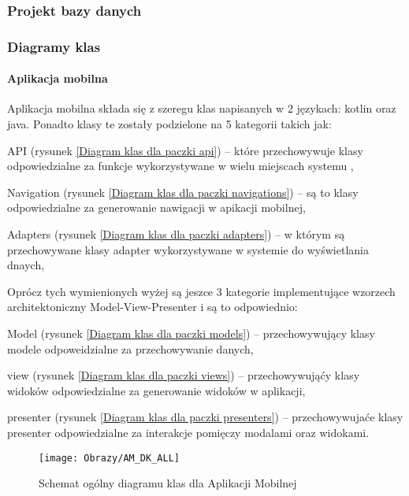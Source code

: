 	\subsubsection{Projekt bazy danych} 
	
	\subsubsection{Diagramy klas} 
	
		\paragraph{Aplikacja mobilna}
		Aplikacja mobilna składa się z szeregu klas napisanych w 2 językach: kotlin oraz java. Ponadto klasy te 
		zostały podzielone na 5 kategorii takich jak:
		\begin{itemize*}
			\item API 
			(rysunek \ref{Diagram klas dla paczki api}) 
			--  które przechowywuje klasy odpowiedzialne za funkcje wykorzystywane w wielu miejscach systemu ,
			\item Navigation 
			(rysunek \ref{Diagram klas dla paczki navigations}) 
			-- są to klasy odpowiedzialne za generowanie nawigacji w apikacji mobilnej,
			\item Adapters
			(rysunek \ref{Diagram klas dla paczki adapters}) 
			 -- w którym są przechowywane klasy adapter wykorzystywane w systemie do wyświetlania dnaych,
		\end{itemize*}
		Oprócz tych wymienionych wyżej są jeszce 3 kategorie implementujące wzorzech architektoniczny Model-View-Presenter i są to odpowiednio:
			\begin{itemize*}
				\item Model
				(rysunek \ref{Diagram klas dla paczki models}) 
				 -- przechowywujący klasy modele odpoweidzialne za przechowywanie danych,   
				\item view 
				(rysunek \ref{Diagram klas dla paczki views}) 
				-- przechowywująćy klasy widoków odpowiedzialne za generowanie widoków w aplikacji, 
				\item presenter
				(rysunek \ref{Diagram klas dla paczki presenters}) 
				 -- przechowywujaće klasy presenter odpowiedzialne za interakcje pomięczy modalami oraz widokami.
			\end{itemize*}
		
	
		\begin{figure}[ht!]
			\centering
			\texttt{[image: Obrazy/AM\_DK\_ALL]}
			\caption{Schemat ogólny diagramu klas dla Aplikacji Mobilnej}
			\label{Schemat ogólny diagramu klas dla Aplikacji mobilnej}
		\end{figure}
	


